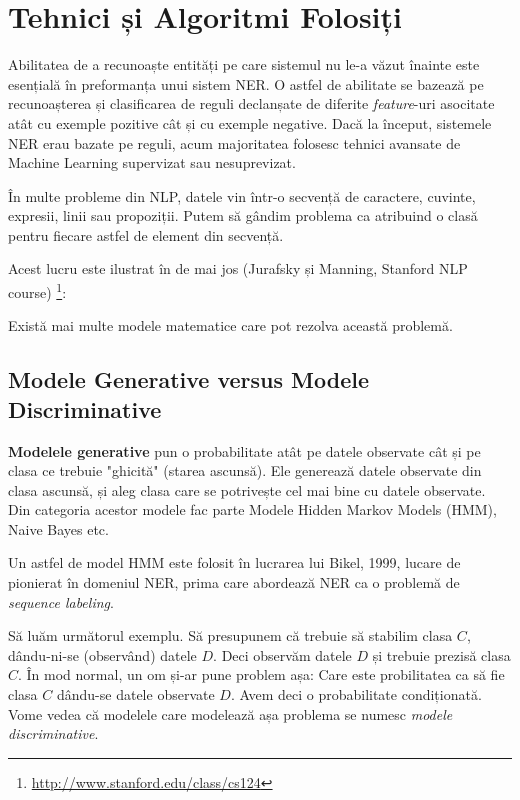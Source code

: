 \chapter{Tehnici și Algoritmi Folosiți}
\label{chapter:algorithms}

Abilitatea de a recunoaște entități pe care sistemul nu le-a văzut înainte este esențială în preformanța unui sistem NER. O astfel de abilitate se bazează pe recunoașterea și clasificarea de reguli declanșate de diferite \textit{feature}-uri asocitate atât cu exemple pozitive cât și cu exemple negative. Dacă la început, sistemele NER erau bazate pe reguli, acum majoritatea folosesc tehnici avansate de Machine Learning supervizat sau nesuprevizat. 

În multe probleme din NLP, datele vin într-o secvență de caractere, cuvinte, expresii, linii sau propoziții. Putem să gândim problema ca atribuind o clasă pentru fiecare astfel de element din secvență.

Acest lucru este ilustrat în  de mai jos (Jurafsky și Manning, Stanford NLP course) \footnote{\url{http://www.stanford.edu/class/cs124}}:


Există mai multe modele matematice care pot rezolva această problemă.

\section{Modele Generative versus Modele Discriminative}

\textbf{Modelele generative} pun o probabilitate atât pe datele observate cât și pe clasa ce trebuie "ghicită" (starea ascunsă). Ele generează datele observate din clasa ascunsă, și aleg clasa care se potrivește cel mai bine cu datele observate. Din categoria acestor modele fac parte Modele Hidden Markov Models (HMM), Naive Bayes etc. 

Un astfel de model HMM este folosit în lucrarea lui Bikel, 1999, lucare de pionierat în domeniul NER, prima care abordează NER ca o problemă de \textit{sequence labeling}.\cite{Bikel99analgorithm}

Să luăm următorul exemplu. Să presupunem că trebuie să stabilim clasa $C$, dându-ni-se (observând) datele $D$. Deci observăm datele $D$ și trebuie prezisă clasa $C$. În mod normal, un om și-ar pune problem așa: Care este probilitatea ca să fie clasa $C$ dându-se datele observate $D$. Avem deci o probabilitate condiționată. Vome vedea că modelele care modelează așa problema se numesc \textit{modele discriminative}.

